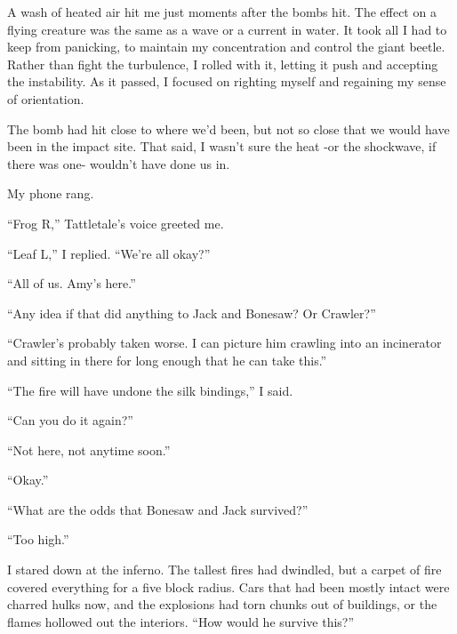 A wash of heated air hit me just moments after the bombs hit.  The effect on a flying creature was the same as a wave or a current in water.  It took all I had to keep from panicking, to maintain my concentration and control the giant beetle.  Rather than fight the turbulence, I rolled with it, letting it push and accepting the instability.  As it passed, I focused on righting myself and regaining my sense of orientation.



The bomb had hit close to where we'd been, but not so close that we would have been in the impact site.  That said, I wasn't sure the heat -or the shockwave, if there was one- wouldn't have done us in.



My phone rang.



``Frog R,'' Tattletale's voice greeted me.



``Leaf L,'' I replied.  ``We're all okay?''



``All of us.  Amy's here.''



``Any idea if that did anything to Jack and Bonesaw?  Or Crawler?''



``Crawler's probably taken worse.  I can picture him crawling into an incinerator and sitting in there for long enough that he can take this.''



``The fire will have undone the silk bindings,'' I said.



``Can you do it again?''



``Not here, not anytime soon.''



``Okay.''



``What are the odds that Bonesaw and Jack survived?''



``Too high.''



I stared down at the inferno.  The tallest fires had dwindled, but a carpet of fire covered everything for a five block radius.  Cars that had been mostly intact were charred hulks now, and the explosions had torn chunks out of buildings, or the flames hollowed out the interiors.  ``How would he survive this?''



